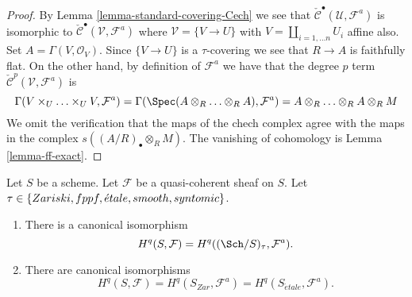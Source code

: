 \begin{proof}
By Lemma \ref{lemma-standard-covering-Cech} we see that
$\check{\mathcal{C}}^\bullet(\mathcal{U}, \mathcal{F}^a)$
is isomorphic to $\check{\mathcal{C}}^\bullet(\mathcal{V}, \mathcal{F}^a)$
where $\mathcal{V} = \{V \to U\}$ with $V = \coprod_{i = 1, \ldots n} U_i$
affine also. Set $A = \Gamma(V, \mathcal{O}_V)$. Since $\{V \to U\}$
is a $\tau$-covering we see that $R \to A$ is faithfully flat.
On the other hand, by definition of $\mathcal{F}^a$ we have
that the degree $p$ term $\check{\mathcal{C}}^p(\mathcal{V}, \mathcal{F}^a)$
is
$$
\Gamma(V \times_U \ldots \times_U V, \mathcal{F}^a)
=
\Gamma(\Spec(A \otimes_R \ldots \otimes_R A), \mathcal{F}^a)
=
A \otimes_R \ldots \otimes_R A \otimes_R M
$$
We omit the verification that the maps of the chech complex agree with
the maps in the complex $s((A/R)_\bullet \otimes_R M)$. The vanishing
of cohomology is Lemma \ref{lemma-ff-exact}.
\end{proof}

\begin{proposition}
\label{proposition-same-cohomology-quasi-coherent}
Let $S$ be a scheme. Let $\mathcal{F}$ be a quasi-coherent sheaf on $S$.
Let $\tau \in \{Zariski, \linebreak[0] fppf, \linebreak[0]
\acute{e}tale, \linebreak[0] smooth, \linebreak[0] syntomic\}$.
\begin{enumerate}
\item There is a canonical isomorphism
$$
H^q(S, \mathcal{F}) = H^q((\Sch/S)_\tau, \mathcal{F}^a).
$$
\item There are canonical isomorphisms
$$
H^q(S, \mathcal{F}) =
H^q(S_{Zar}, \mathcal{F}^a) =
H^q(S_{\acute{e}tale}, \mathcal{F}^a).
$$
\end{enumerate}
\end{proposition}

